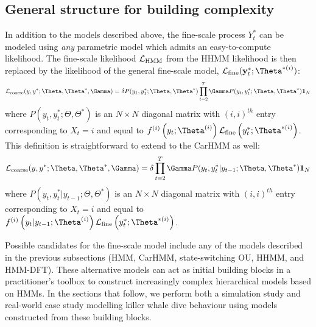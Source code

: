\subsection{General structure for building complexity}

In addition to the models described above, the fine-scale process $Y^*_t$ can be modeled using \textit{any} parametric model which admits an easy-to-compute likelihood. The fine-scale likelihood $\mathcal{L}_{\text{HMM}}$ from the HHMM likelihood is then replaced by the likelihood of the general fine-scale model, $\calL_{\text{fine}}(\mathbf{y}^*_t;\Theta^{*(i)})$:
\[
\calL_{\text{coarse}}(y,y^*;\Theta,\Theta^*,\Gamma) = \delta P(y_1,y^*_1;\Theta,\Theta^*) \prod_{t=2}^T \Gamma P(y_t,y^*_t;\Theta,\Theta^*) \mathbf{1}_N
\]
where $P(y_t,y^*_t;\Theta,\Theta^*) $ is an $N \times N$ diagonal matrix with $(i,i)^{th}$ entry corresponding to $X_t=i$ and equal to $f^{(i)}\left(y_t;\Theta^{(i)}\right)\calL_{\text{fine}}\left(y^*_t;\Theta^{*(i)}\right)$. This definition is straightforward to extend to the CarHMM as well:
\[
\calL_{\text{coarse}}(y,y^*;\Theta,\Theta^*,\Gamma) = \delta \prod_{t=2}^T \Gamma P(y_t,y^*_t|y_{t-1};\Theta,\Theta^*) \mathbf{1}_N
\]
where $P(y_t,y^*_t|y_{t-1};\Theta,\Theta^*) $ is an $N \times N$ diagonal matrix with $(i,i)^{th}$ entry corresponding to $X_t=i$ and equal to $f^{(i)}\left(y_t|y_{t-1};\Theta^{(i)}\right)\calL_{\text{fine}}\left(y^*_t;\Theta^{*(i)}\right)$.

Possible candidates for the fine-scale model include any of the models described in the previous subsections (HMM, CarHMM, state-switching OU, HHMM, and HMM-DFT). These alternative models can act as initial building blocks in a practitioner's toolbox to construct increasingly complex hierarchical models based on HMMs. In the sections that follow, we perform both a simulation study and real-world case study modelling killer whale dive behaviour using models constructed from these building blocks.